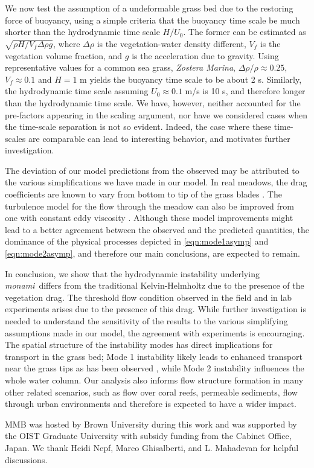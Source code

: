 \documentclass[aps,preprint,12pt]{revtex4-1}  %
\newcommand{\monami}{\textit{monami}}
\begin{document}
We now test the assumption of a undeformable grass bed due to the restoring force of buoyancy, using a simple criteria that the buoyancy time scale  be much shorter than the hydrodynamic time scale $H/U_0$.
The former can be estimated as $\sqrt{\rho H/V_f \Delta \rho g}$, where $\Delta \rho$ is the vegetation-water density different, $V_f$ is the vegetation volume fraction, and $g$ is the acceleration due to gravity. 
Using representative values for a common sea grass, \textit{Zostera Marina}, $\Delta \rho /\rho \approx 0.25$, $V_f \approx 0.1$ and $H=1$ m \cite{Fonseca98} yields the buoyancy time scale to be about 2 s. 
Similarly, the hydrodynamic time scale assuming $U_0 \approx 0.1$ m/s is 10 s, and therefore longer than the hydrodynamic time scale.
We have, however, neither accounted for the pre-factors appearing in the scaling argument, nor have we considered cases when the time-scale separation is not so evident.
Indeed, the case where these time-scales are comparable can lead to interesting behavior\cite{Delangre06}, and motivates further investigation. 

The deviation of our model predictions from the observed may be attributed to the various simplifications we have made in our model. 
In real meadows, the drag coefficients are known to vary from bottom to tip of the grass blades \cite{Vivoni98,Nepf00}. 
The turbulence model for the flow through the meadow can also be improved from one with constant eddy viscosity \cite{Ghisal02, Nepf04}. 
Although these model improvements might lead to a better agreement between the observed and the predicted quantities, the dominance of the physical processes depicted in \eqref{eqn:mode1asymp} and \eqref{eqn:mode2asymp}, and therefore our main conclusions, are expected to remain.

In conclusion, we show that the hydrodynamic instability underlying \monami ~differs from the traditional Kelvin-Helmholtz due to the presence of the vegetation drag. 
The threshold flow condition observed in the field and in lab experiments arises due to the presence of this drag. 
While further investigation is needed to understand the sensitivity of the results to the various simplifying assumptions made in our model, the agreement with experiments is encouraging.
The spatial structure of the instability modes has direct implications for transport in the grass bed; Mode 1 instability likely leads to enhanced transport near the grass tips as has been observed \cite{Nepf04,Okamoto12}, while Mode 2 instability influences the whole water column.
Our analysis also informs flow structure formation in many other related scenarios, such as flow over coral reefs, permeable sediments, flow through urban environments and therefore is expected to have a wider impact.

\acknowledgments
MMB was hosted by Brown University during this work and was supported by the OIST Graduate University with subsidy funding from the Cabinet Office, Japan. We thank Heidi Nepf, Marco Ghisalberti, and L. Mahadevan for helpful discussions.

{}
% 

\end{document}
